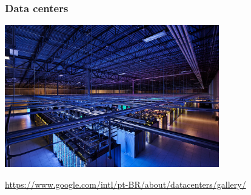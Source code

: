 \documentclass[xcolor={usenames,dvipsnames},12pt,presentation,aspectratio=169]{beamer}
\begin{document}
\begin{frame}
  \frametitle{Data centers}
  \vspace{-3mm}
  \begin{center}
	\includegraphics[width=0.7\textwidth]{council-bluffs-interior.jpg}
  \end{center}
  {\footnotesize \url{https://www.google.com/intl/pt-BR/about/datacenters/gallery/}}
\end{frame}
\end{document}
